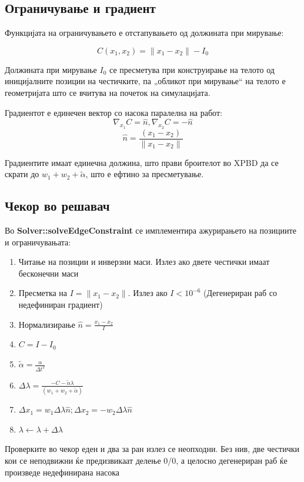 \subsection{Ограничување и градиент}

Функцијата на ограничувањето е отстапувањето од должината при мирување:

$$C(x_1, x_2) = \lVert x_1 - x_2 \rVert - I_0$$

Должината при мирување $I_0$ се пресметува при конструирање на телото од иницијалните позиции на честичките, па „обликот при мирување“ на телото е геометријата што се вчитува на почеток на симулацијата.

Градиентот е единечен вектор со насока паралелна на работ:
$$\nabla_{x_1} C = \hat{n}, \nabla_{x_2}C = -\hat{n}$$
$$ \hat{n} = \frac{(x_1 - x_2)}{\lVert x_1 - x_2 \rVert}$$

Градиентите имаат единечна должина, што прави броителот во XPBD да се скрати до $w_1 + w_2 + \tilde{\alpha}$, што е ефтино за пресметување.

\subsection{Чекор во решавач}

Во \textbf{Solver::solveEdgeConstraint} се имплементира ажурирањето на позициите и ограничувањата:
\begin{enumerate}
	\item Читање на позиции и инверзни маси. Излез ако двете честички имаат бесконечни маси
	\item Пресметка на $I = \lVert x_1 - x_2 \rVert$. Излез ако $I < 10^{-6}$ (Дегенериран раб со недефиниран градиент)
	\item Нормализирање $\hat{n} = \frac{x_1 - x_2}{I}$
	\item $C = I - I_0$
	\item $\tilde{\alpha} = \frac{\alpha}{\Delta t^2}$
	\item $\Delta \lambda = \frac{-C-\tilde{\alpha}\lambda}{(w_1 + w_2 + \tilde{\alpha})}$
	\item $\Delta x_1 = w_1 \Delta \lambda \hat{n}; \Delta x_2 = -w_2 \Delta \lambda \hat{n}$
	\item $\lambda \leftarrow \lambda + \Delta \lambda$
\end{enumerate}

Проверките во чекор еден и два за ран излез се неопходни. Без нив, две честички кои се неподвижни ќе предизвикаат делење 0/0, а целосно дегенериран раб ќе произведе недефинирана насока

